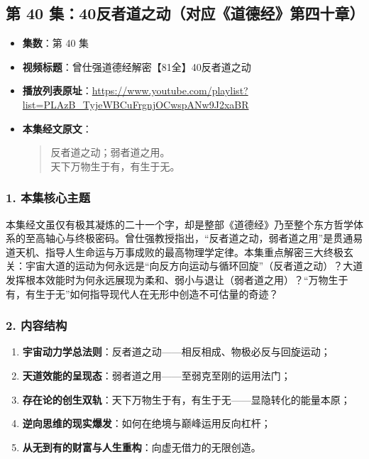 \clearpage

\subsection{第 40 集：40反者道之动（对应《道德经》第四十章）}
\label{sec:ep40}

\begin{itemize}
    \item \textbf{集数}：第 40 集
    \item \textbf{视频标题}：曾仕强道德经解密【81全】40反者道之动
    \item \textbf{播放列表原址}：\url{https://www.youtube.com/playlist?list=PLAzB_TyjeWBCuFrgnjOCwspANw9J2xaBR}
    \item \textbf{本集经文原文}：
    \begin{quote}\kaishu
    反者道之动；弱者道之用。\\
    天下万物生于有，有生于无。
    \end{quote}
\end{itemize}

\subsubsection{1. 本集核心主题}
本集经文虽仅有极其凝炼的二十一个字，却是整部《道德经》乃至整个东方哲学体系的至高轴心与终极密码。曾仕强教授指出，“反者道之动，弱者道之用”是贯通易道天机、指导人生命运与万事成败的最高物理学定律。本集重点解密三大终极玄关：宇宙大道的运动为何永远是“向反方向运动与循环回旋”（反者道之动）？大道发挥根本效能时为何永远展现为柔和、弱小与退让（弱者道之用）？“万物生于有，有生于无”如何指导现代人在无形中创造不可估量的奇迹？

\subsubsection{2. 内容结构}
\begin{enumerate}
    \item \textbf{宇宙动力学总法则}：反者道之动——相反相成、物极必反与回旋运动；
    \item \textbf{天道效能的呈现态}：弱者道之用——至弱克至刚的运用法门；
    \item \textbf{存在论的创生双轨}：天下万物生于有，有生于无——显隐转化的能量本原；
    \item \textbf{逆向思维的现实爆发}：如何在绝境与巅峰运用反向杠杆；
    \item \textbf{从无到有的财富与人生重构}：向虚无借力的无限创造。
\end{enumerate}

